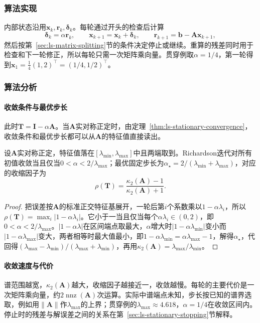 \subsubsection{算法实现}

内部状态沿用$\bm x_k,\bm r_k,\bm\delta_k$。每轮通过开头的检查后计算
\[
\bm\delta_k=\alpha\bm r_k,\qquad
\bm x_{k+1}=\bm x_k+\bm\delta_k,\qquad
\bm r_{k+1}=\bm b-\bm A\bm x_{k+1},
\]
然后按第~\ref{sec:ls-matrix-splitting}节的条件决定停止或继续。重算的残差同时用于检查和下一轮修正，所以每轮只需一次矩阵乘向量。贯穿例取$\alpha=1/4$，第一轮得到$\bm x_1=\tfrac14(1,2)^\top=(1/4,1/2)^\top$。

\subsubsection{算法分析}

\paragraph{收敛条件与最优步长}
此时$\bm T=\bm I-\alpha\bm A$。当$\bm A$实对称正定时，由定理~\ref{thm:ls-stationary-convergence}，收敛条件和最优步长都可以从$\bm A$的特征值直接读出。
\begin{theorem}[对称正定矩阵的Richardson迭代]
\label{thm:ls-richardson-spd}
设$\bm A$实对称正定，特征值落在$[\lambda_{\min},\lambda_{\max}]$中且两端取到。Richardson迭代对所有初值收敛当且仅当$0<\alpha<2/\lambda_{\max}$；最优固定步长为$\alpha_\star=2/(\lambda_{\min}+\lambda_{\max})$，对应的收缩因子为
\[
\rho(\bm T)=\frac{\kappa_2(\bm A)-1}{\kappa_2(\bm A)+1}.
\]
\end{theorem}
\begin{proof}
把误差按$\bm A$的标准正交特征基展开，一轮后第$i$个系数乘以$1-\alpha\lambda_i$，所以$\rho(\bm T)=\max_i|1-\alpha\lambda_i|$。它小于一当且仅当每个$\alpha\lambda_i\in(0,2)$，即$0<\alpha<2/\lambda_{\max}$。$|1-\alpha\lambda|$在区间端点取最大，$\alpha$增大时$|1-\alpha\lambda_{\min}|$变小而$|1-\alpha\lambda_{\max}|$变大，两者相等时最大值最小，即$1-\alpha\lambda_{\min}=\alpha\lambda_{\max}-1$，解得$\alpha_\star$，代回得$(\lambda_{\max}-\lambda_{\min})/(\lambda_{\max}+\lambda_{\min})$，再用$\kappa_2(\bm A)=\lambda_{\max}/\lambda_{\min}$。
\end{proof}
\paragraph{收敛速度与代价}
谱范围越宽，$\kappa_2(\bm A)$越大，收缩因子越接近一，收敛越慢。每轮的主要代价是一次矩阵乘向量，约$2\operatorname{nnz}(\bm A)$次运算。实际中谱端点未知，步长按已知的谱界选取，例如用$\lVert\bm A\rVert$作$\lambda_{\max}$的上界；贯穿例的$\lambda_{\max}\approx4.618$，$\alpha=1/4$在收敛区间内。停止时的残差与解误差之间的关系在第~\ref{sec:ls-stationary-stopping}节解释。

